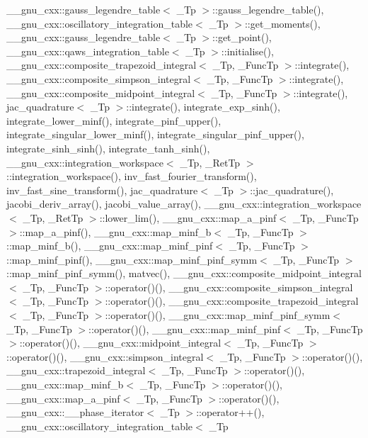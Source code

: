 \+\_\+\+\_\+gnu\+\_\+cxx\+::gauss\+\_\+legendre\+\_\+table$<$ \+\_\+\+Tp $>$\+::gauss\+\_\+legendre\+\_\+table(), \+\_\+\+\_\+gnu\+\_\+cxx\+::oscillatory\+\_\+integration\+\_\+table$<$ \+\_\+\+Tp $>$\+::get\+\_\+moments(), \+\_\+\+\_\+gnu\+\_\+cxx\+::gauss\+\_\+legendre\+\_\+table$<$ \+\_\+\+Tp $>$\+::get\+\_\+point(), \+\_\+\+\_\+gnu\+\_\+cxx\+::qaws\+\_\+integration\+\_\+table$<$ \+\_\+\+Tp $>$\+::initialise(), \+\_\+\+\_\+gnu\+\_\+cxx\+::composite\+\_\+trapezoid\+\_\+integral$<$ \+\_\+\+Tp, \+\_\+\+Func\+Tp $>$\+::integrate(), \+\_\+\+\_\+gnu\+\_\+cxx\+::composite\+\_\+simpson\+\_\+integral$<$ \+\_\+\+Tp, \+\_\+\+Func\+Tp $>$\+::integrate(), \+\_\+\+\_\+gnu\+\_\+cxx\+::composite\+\_\+midpoint\+\_\+integral$<$ \+\_\+\+Tp, \+\_\+\+Func\+Tp $>$\+::integrate(), jac\+\_\+quadrature$<$ \+\_\+\+Tp $>$\+::integrate(), integrate\+\_\+exp\+\_\+sinh(), integrate\+\_\+lower\+\_\+minf(), integrate\+\_\+pinf\+\_\+upper(), integrate\+\_\+singular\+\_\+lower\+\_\+minf(), integrate\+\_\+singular\+\_\+pinf\+\_\+upper(), integrate\+\_\+sinh\+\_\+sinh(), integrate\+\_\+tanh\+\_\+sinh(), \+\_\+\+\_\+gnu\+\_\+cxx\+::integration\+\_\+workspace$<$ \+\_\+\+Tp, \+\_\+\+Ret\+Tp $>$\+::integration\+\_\+workspace(), inv\+\_\+fast\+\_\+fourier\+\_\+transform(), inv\+\_\+fast\+\_\+sine\+\_\+transform(), jac\+\_\+quadrature$<$ \+\_\+\+Tp $>$\+::jac\+\_\+quadrature(), jacobi\+\_\+deriv\+\_\+array(), jacobi\+\_\+value\+\_\+array(), \+\_\+\+\_\+gnu\+\_\+cxx\+::integration\+\_\+workspace$<$ \+\_\+\+Tp, \+\_\+\+Ret\+Tp $>$\+::lower\+\_\+lim(), \+\_\+\+\_\+gnu\+\_\+cxx\+::map\+\_\+a\+\_\+pinf$<$ \+\_\+\+Tp, \+\_\+\+Func\+Tp $>$\+::map\+\_\+a\+\_\+pinf(), \+\_\+\+\_\+gnu\+\_\+cxx\+::map\+\_\+minf\+\_\+b$<$ \+\_\+\+Tp, \+\_\+\+Func\+Tp $>$\+::map\+\_\+minf\+\_\+b(), \+\_\+\+\_\+gnu\+\_\+cxx\+::map\+\_\+minf\+\_\+pinf$<$ \+\_\+\+Tp, \+\_\+\+Func\+Tp $>$\+::map\+\_\+minf\+\_\+pinf(), \+\_\+\+\_\+gnu\+\_\+cxx\+::map\+\_\+minf\+\_\+pinf\+\_\+symm$<$ \+\_\+\+Tp, \+\_\+\+Func\+Tp $>$\+::map\+\_\+minf\+\_\+pinf\+\_\+symm(), matvec(), \+\_\+\+\_\+gnu\+\_\+cxx\+::composite\+\_\+midpoint\+\_\+integral$<$ \+\_\+\+Tp, \+\_\+\+Func\+Tp $>$\+::operator()(), \+\_\+\+\_\+gnu\+\_\+cxx\+::composite\+\_\+simpson\+\_\+integral$<$ \+\_\+\+Tp, \+\_\+\+Func\+Tp $>$\+::operator()(), \+\_\+\+\_\+gnu\+\_\+cxx\+::composite\+\_\+trapezoid\+\_\+integral$<$ \+\_\+\+Tp, \+\_\+\+Func\+Tp $>$\+::operator()(), \+\_\+\+\_\+gnu\+\_\+cxx\+::map\+\_\+minf\+\_\+pinf\+\_\+symm$<$ \+\_\+\+Tp, \+\_\+\+Func\+Tp $>$\+::operator()(), \+\_\+\+\_\+gnu\+\_\+cxx\+::map\+\_\+minf\+\_\+pinf$<$ \+\_\+\+Tp, \+\_\+\+Func\+Tp $>$\+::operator()(), \+\_\+\+\_\+gnu\+\_\+cxx\+::midpoint\+\_\+integral$<$ \+\_\+\+Tp, \+\_\+\+Func\+Tp $>$\+::operator()(), \+\_\+\+\_\+gnu\+\_\+cxx\+::simpson\+\_\+integral$<$ \+\_\+\+Tp, \+\_\+\+Func\+Tp $>$\+::operator()(), \+\_\+\+\_\+gnu\+\_\+cxx\+::trapezoid\+\_\+integral$<$ \+\_\+\+Tp, \+\_\+\+Func\+Tp $>$\+::operator()(), \+\_\+\+\_\+gnu\+\_\+cxx\+::map\+\_\+minf\+\_\+b$<$ \+\_\+\+Tp, \+\_\+\+Func\+Tp $>$\+::operator()(), \+\_\+\+\_\+gnu\+\_\+cxx\+::map\+\_\+a\+\_\+pinf$<$ \+\_\+\+Tp, \+\_\+\+Func\+Tp $>$\+::operator()(), \+\_\+\+\_\+gnu\+\_\+cxx\+::\+\_\+\+\_\+phase\+\_\+iterator$<$ \+\_\+\+Tp $>$\+::operator++(), \+\_\+\+\_\+gnu\+\_\+cxx\+::oscillatory\+\_\+integration\+\_\+table$<$ \+\_\+\+Tp 